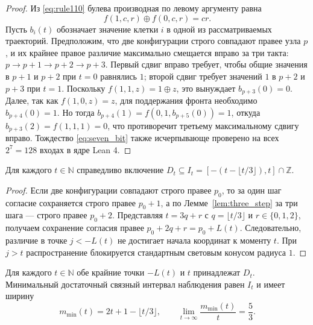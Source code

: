 \begin{proof}
Из \eqref{eq:rule110} булева производная по левому аргументу равна
\begin{equation}\label{eq:bool_deriv}
f(1, c, r) \oplus f(0, c, r) = cr.
\end{equation}
Пусть $b_i(t)$ обозначает значение клетки $i$ в одной из рассматриваемых траекторий. Предположим, что две конфигурации строго совпадают правее узла $p$, и их крайнее правое различие максимально смещается вправо за три такта: $p \to p+1 \to p+2 \to p+3$. Первый сдвиг вправо требует, чтобы общие значения в $p+1$ и $p+2$ при $t=0$ равнялись $1$; второй сдвиг требует значений $1$ в $p+2$ и $p+3$ при $t=1$. Поскольку $f(1, 1, z) = 1 \oplus z$, это вынуждает $b_{p+3}(0) = 0$. Далее, так как $f(1, 0, z) = z$, для поддержания фронта необходимо $b_{p+4}(0) = 1$. Но тогда $b_{p+4}(1) = f(0, 1, b_{p+5}(0)) = 1$, откуда $b_{p+3}(2) = f(1, 1, 1) = 0$, что противоречит третьему максимальному сдвигу вправо. Тождество \eqref{eq:seven_bit} также исчерпывающе проверено на всех $2^7 = 128$ входах в ядре Lean 4.
\end{proof}

\begin{theorem}\label{thm:upper_bound}
Для каждого $t \in \mathbb{N}$ справедливо включение $D_t \subseteq I_t = [-(t - \lfloor t/3 \rfloor), t] \cap \mathbb{Z}$.
\end{theorem}

\begin{proof}
Если две конфигурации совпадают строго правее $p_0$, то за один шаг согласие сохраняется строго правее $p_0 + 1$, а по Лемме~\ref{lem:three_step} за три шага — строго правее $p_0 + 2$. Представляя $t = 3q + r$ с $q = \lfloor t/3 \rfloor$ и $r \in \{0, 1, 2\}$, получаем сохранение согласия правее $p_0 + 2q + r = p_0 + L(t)$. Следовательно, различие в точке $j < -L(t)$ не достигает начала координат к моменту $t$. При $j > t$ распространение блокируется стандартным световым конусом радиуса $1$.
\end{proof}

\begin{theorem}\label{thm:sharpness}
Для каждого $t \in \mathbb{N}$ обе крайние точки $-L(t)$ и $t$ принадлежат $D_t$. Минимальный достаточный связный интервал наблюдения равен $I_t$ и имеет ширину
\begin{equation}
m_{\min}(t) = 2t + 1 - \lfloor t/3 \rfloor, \qquad \lim_{t \to \infty} \frac{m_{\min}(t)}{t} = \frac{5}{3}.
\end{equation}
\end{theorem}

